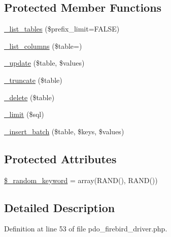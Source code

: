 \subsection*{Protected Member Functions}
\begin{DoxyCompactItemize}
\item 
\mbox{\hyperlink{class_c_i___d_b__pdo__firebird__driver_a435c0f3ce54fe7daa178baa8532ebd54}{\+\_\+list\+\_\+tables}} (\$prefix\+\_\+limit=F\+A\+L\+SE)
\item 
\mbox{\hyperlink{class_c_i___d_b__pdo__firebird__driver_a7ccb7f9c301fe7f0a9db701254142b63}{\+\_\+list\+\_\+columns}} (\$table=\textquotesingle{}\textquotesingle{})
\item 
\mbox{\hyperlink{class_c_i___d_b__pdo__firebird__driver_a2540b03a93fa73ae74c10d0e16fc073e}{\+\_\+update}} (\$table, \$values)
\item 
\mbox{\hyperlink{class_c_i___d_b__pdo__firebird__driver_aa029600528fc1ce660a23ff4b4667f95}{\+\_\+truncate}} (\$table)
\item 
\mbox{\hyperlink{class_c_i___d_b__pdo__firebird__driver_a133ea8446ded52589bd22cc9163d0896}{\+\_\+delete}} (\$table)
\item 
\mbox{\hyperlink{class_c_i___d_b__pdo__firebird__driver_a3a02ea06541b8ecc25a33a61651562c8}{\+\_\+limit}} (\$sql)
\item 
\mbox{\hyperlink{class_c_i___d_b__pdo__firebird__driver_a1978e1358c812587a46e242630365099}{\+\_\+insert\+\_\+batch}} (\$table, \$keys, \$values)
\end{DoxyCompactItemize}
\subsection*{Protected Attributes}
\begin{DoxyCompactItemize}
\item 
\mbox{\hyperlink{class_c_i___d_b__pdo__firebird__driver_a10213aa6e05f6d924d3277bb1d2fea00}{\$\+\_\+random\+\_\+keyword}} = array(\textquotesingle{}R\+A\+ND()\textquotesingle{}, \textquotesingle{}R\+A\+ND()\textquotesingle{})
\end{DoxyCompactItemize}


\subsection{Detailed Description}


Definition at line 53 of file pdo\+\_\+firebird\+\_\+driver.\+php.



